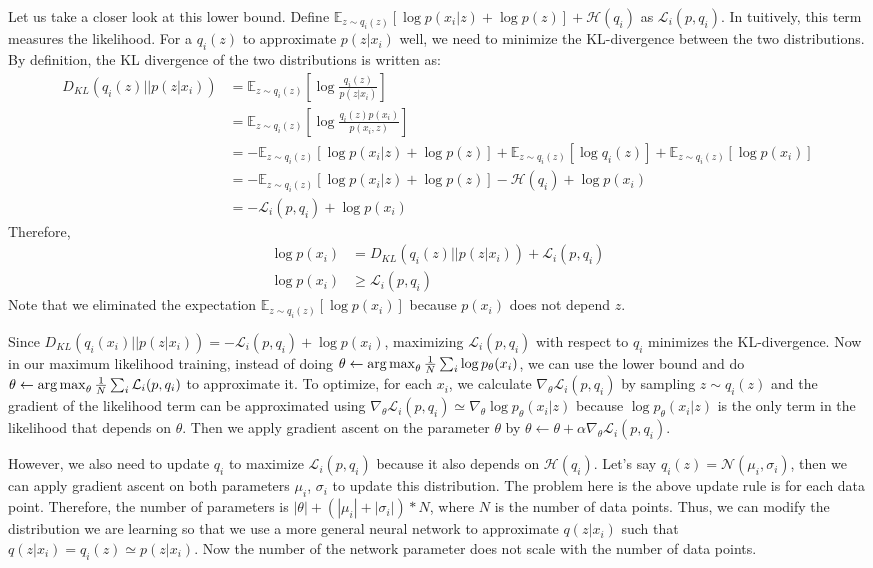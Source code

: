 Let us take a closer look at this lower bound. Define $\mathbb{E}_{z\sim q_i(z)}\left[\log p(x_i|z)+\log p(z)\right] + \mathcal{H}(q_i)$ as $\mathcal{L}_i(p,q_i)$. In tuitively, this term measures the likelihood. For a $q_i(z)$ to approximate $p(z|x_i)$ well, we need to minimize the KL-divergence between the two distributions. By definition, the KL divergence of the two distributions is written as:
\begin{align*}
    D_{KL}(q_i(z)||p(z|x_i))&=\mathbb{E}_{z\sim q_i(z)}\left[\log \frac{q_i(z)}{p(z|x_i)}\right]\\
    &=\mathbb{E}_{z\sim q_i(z)}\left[\log \frac{q_i(z)p(x_i)}{p(x_i,z)}\right]\\
    &= -\mathbb{E}_{z\sim q_i(z)}\left[\log p(x_i|z)+\log p(z)\right] + \mathbb{E}_{z\sim q_i(z)}\left[\log q_i(z)\right]+ \mathbb{E}_{z\sim q_i(z)}\left[\log p(x_i)\right]\\
    &= -\mathbb{E}_{z\sim q_i(z)}\left[\log p(x_i|z)+\log p(z)\right] -\mathcal{H}(q_i)+\log p(x_i)\\
    &=-\mathcal{L}_i(p,q_i) + \log p(x_i)
\end{align*}
Therefore,
\begin{align*}
    \log p(x_i) &= D_{KL}(q_i(z)||p(z|x_i)) + \mathcal{L}_i(p,q_i)\\
    \log p(x_i) &\geq \mathcal{L}_i(p,q_i)
\end{align*}
Note that we eliminated the expectation $\mathbb{E}_{z\sim q_i(z)}\left[\log p(x_i)\right]$ because $p(x_i)$ does not depend $z$.

Since $D_{KL}(q_i(x_i)||p(z|x_i)) = -\mathcal{L}_i(p,q_i) + \log p(x_i)$, maximizing $\mathcal{L}_i(p,q_i)$ with respect to $q_i$ minimizes the KL-divergence. Now in our maximum likelihood training, instead of doing $\theta \leftarrow \operatorname*{arg\,max}_\theta \frac{1}{N}\sum_i \log p_\theta(x_i)$, we can use the lower bound and do $\theta \leftarrow \operatorname*{arg\,max}_\theta \frac{1}{N}\sum_i \mathcal{L}_i(p,q_i)$ to approximate it. To optimize, for each $x_i$, we calculate $\nabla_\theta\mathcal{L}_i(p,q_i)$ by sampling $z\sim q_i(z)$ and the gradient of the likelihood term can be approximated using $\nabla_\theta\mathcal{L}_i(p,q_i)\simeq \nabla_\theta\log p_\theta(x_i|z)$ because $\log p_\theta(x_i|z)$ is the only term in the likelihood that depends on $\theta$. Then we apply gradient ascent on the parameter $\theta$ by $\theta \leftarrow \theta + \alpha\nabla_\theta\mathcal{L}_i(p,q_i)$.

However, we also need to update $q_i$ to maximize $\mathcal{L}_i(p,q_i)$ because it also depends on $\mathcal{H}(q_i)$. Let's say $q_i(z) = \mathcal{N}(\mu_i,\sigma_i)$, then we can apply gradient ascent on both parameters $\mu_i$, $\sigma_i$ to update this distribution. The problem here is the above update rule is for each data point. Therefore, the number of parameters is $|\theta| + (|\mu_i| + |\sigma_i|)*N$, where $N$ is the number of data points. Thus, we can modify the distribution we are learning so that we use a more general neural network to approximate $q(z|x_i)$ such that $q(z|x_i) = q_i(z)\simeq p(z|x_i)$. Now the number of the network parameter does not scale with the number of data points. 

